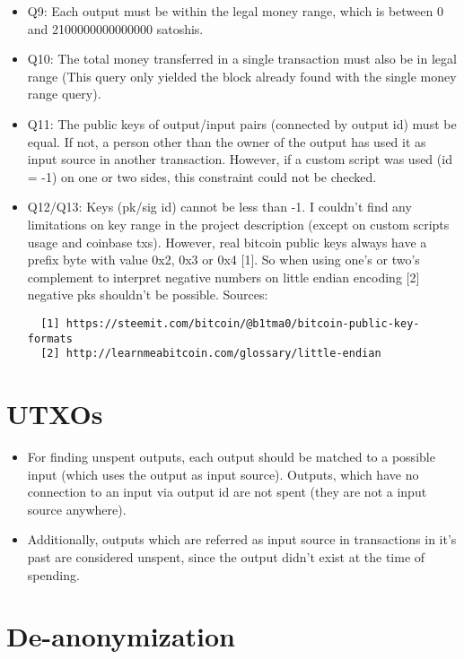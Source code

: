 \documentclass[12pt,a4paper]{article}
\begin{document}
\begin{itemize}
\item Q9: Each output must be within the legal money range, which is between 0 and 2100000000000000 satoshis.
\item Q10: The total money transferred in a single transaction must also be in legal range (This query only yielded the block already found with the single money range query).

\item Q11: The public keys of output/input pairs (connected by output id) must be equal. If not, a person other than the owner of the output has used it as
input source in another transaction. However, if a custom script was used (id = -1) on one or two sides, this constraint could not be checked.\newline

\item Q12/Q13: Keys (pk/sig id) cannot be less than -1. I couldn't find any limitations on key range in the project description (except on custom scripts usage and coinbase txs).
However, real bitcoin public keys always have a prefix byte with value 0x2, 0x3 or 0x4 [1].
So when using one's or two's complement to interpret negative numbers on little endian encoding [2] negative pks shouldn't be possible.
\newline
Sources:
\begin{verbatim}
  [1] https://steemit.com/bitcoin/@b1tma0/bitcoin-public-key-formats
  [2] http://learnmeabitcoin.com/glossary/little-endian
\end{verbatim}
\end{itemize}

\section{UTXOs}
\begin{itemize}
\item For finding unspent outputs, each output should be matched to a possible input (which uses the output as input source).
Outputs, which have no connection to an input via output id are not spent (they are not a input source anywhere).
\item Additionally, outputs which are referred as input source in transactions in it's past are considered unspent,
since the output didn't exist at the time of spending.
\end{itemize}
\section{De-anonymization}
\end{document}
